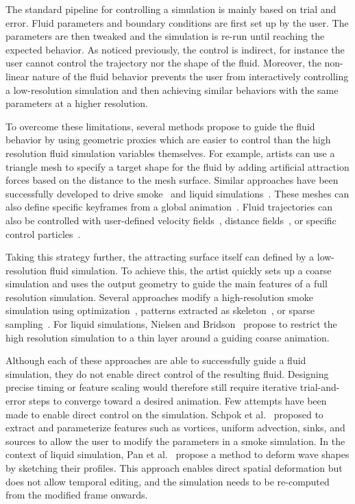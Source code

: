 The standard pipeline for controlling a simulation is mainly based on trial and error. Fluid parameters and boundary conditions are first set up by the user. The parameters are then tweaked and the simulation is re-run until reaching the expected behavior. As noticed previously, the control is indirect, for instance the user cannot control the trajectory nor the shape of the fluid. Moreover, the non-linear nature of the fluid behavior prevents the user from interactively controlling a low-resolution simulation and then achieving similar behaviors with the same parameters at a higher resolution.

To overcome these limitations, several methods propose to guide the fluid behavior by using geometric proxies which are easier to control than the high resolution fluid simulation variables themselves.
For example, artists can use a triangle mesh to specify a target shape for the fluid by adding artificial attraction forces based on the distance to the mesh surface. Similar approaches have been successfully developed to drive smoke~\cite{Fattal2004,Hong2004,Shi2005a} and liquid simulations~\cite{Shi2005b,Raveendran2012}. These meshes can also define specific keyframes from a global animation~\cite{Treuille2003,McNamara2004}.
Fluid trajectories can also be controlled with user-defined velocity fields~\cite{Kim2006}, distance fields~\cite{Yang2013}, or specific control particles~\cite{Thurey2006,Madill2013}. 

Taking this strategy further, the attracting surface itself can defined by a low-resolution fluid simulation. To achieve this, the artist quickly sets up a coarse simulation and uses the output geometry to guide the main features of a full resolution simulation.
Several approaches modify a high-resolution smoke simulation using optimization~\cite{Nielsen2009,Nielsen2010}, patterns extracted as skeleton~\cite{Yuan2011}, or sparse sampling~\cite{Huang2013}.
For liquid simulations, Nielsen and Bridson~\cite{Nielsen2011} propose to restrict the high resolution simulation to a thin layer around a guiding coarse animation.

Although each of these approaches are able to successfully guide a fluid simulation, they do not enable direct control of the resulting fluid. Designing precise timing or feature scaling would therefore still require iterative trial-and-error steps to converge toward a desired animation.
Few attempts have been made to enable direct control on the simulation. Schpok et al.~\cite{Schpok2005} proposed to extract and parameterize features such as vortices, uniform advection, sinks, and sources to allow the user to modify the parameters in a smoke simulation. In the context of liquid simulation, Pan et al.~\cite{Pan2013} propose a method to deform wave shapes by sketching their profiles. This approach enables direct spatial deformation but does not allow temporal editing, and the simulation needs to be re-computed from the modified frame onwards.

